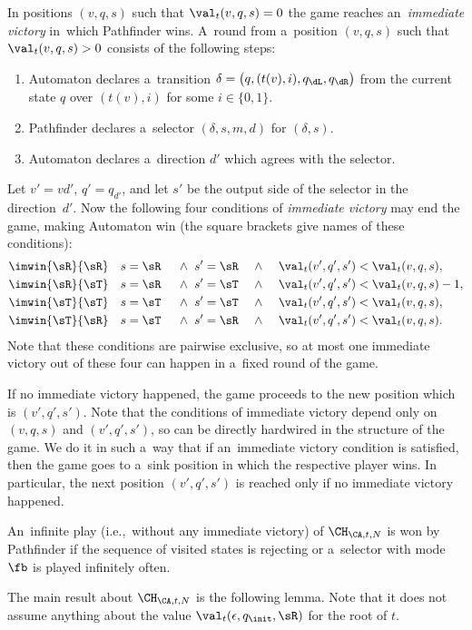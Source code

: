 \documentclass{lmcs}
\numberwithin{equation}{section}
\numberwithin{figure}{section}
\begin{document}
In positions $(v,q,s)$ such that $\val_t(v,q,s)=0$ the game reaches an~\emph{immediate victory} in~which Pathfinder wins.
A~round from a~position $(v,q,s)$ such that $\val_t(v,q,s)>0$ consists of the following steps:
\begin{enumerate}
\item Automaton declares a~transition $\delta=\big(q,(t(v),i),q_\dL,q_\dR\big)$ from the current state $q$ over $(t(v),i)$ for some $i\in\{0,1\}$.
\item Pathfinder declares a~selector $(\delta,s,m,d)$ for $(\delta,s)$.
\item Automaton declares a~direction $d'$ which agrees with the selector.
\end{enumerate}
\noindent %
Let $v'=vd'$, $q'=q_{d'}$, and let $s'$ be the output side of the selector in the direction~$d'$.
Now the following four conditions of \emph{immediate victory} may end the game, making Automaton win (the square brackets give names of these conditions):
\begin{alignat*}{8}
\imwin{\sR}{\sR}\quad&s=\sR &&\ \land\ s'=\sR &&\ \land\ && \val_t(v',q',s')< \val_t(v,q,s),\\
\imwin{\sR}{\sT}\quad&s=\sR &&\ \land\ s'=\sT &&\ \land\ && \val_t(v',q',s')< \val_t(v,q,s)-1,\\
\imwin{\sT}{\sT}\quad&s=\sT &&\ \land\ s'=\sT &&\ \land\ && \val_t(v',q',s')< \val_t(v,q,s),\\
\imwin{\sT}{\sR}\quad&s=\sT &&\ \land\ s'=\sR &&\ \land\ && \val_t(v',q',s')< \val_t(v,q,s).
\end{alignat*}
Note that these conditions are pairwise exclusive, so at most one immediate victory out of these four can happen in a~fixed round of the game.

If no immediate victory happened, the game proceeds to the new position which is $(v',q',s')$.
Note that the conditions of immediate victory depend only on $(v,q,s)$ and $(v',q',s')$, so can be directly hardwired in the structure of the game.
We do it in such a~way that if an~immediate victory condition is satisfied, then the game goes to a~sink position in which the respective player wins.
In particular, the next position $(v',q',s')$ is reached only if no immediate victory happened.

An~infinite play (i.e.,~without any immediate victory) of $\CH_{\CA,t,N}$ is won by Pathfinder if the sequence of visited states is rejecting or a~selector with mode $\fb$ is played infinitely often.

The main result about $\CH_{\CA,t,N}$ is the following lemma.
Note that it does not assume anything about the value $\val_t(\epsilon,q_\init,\sR)$ for the root of $t$.
\end{document}
